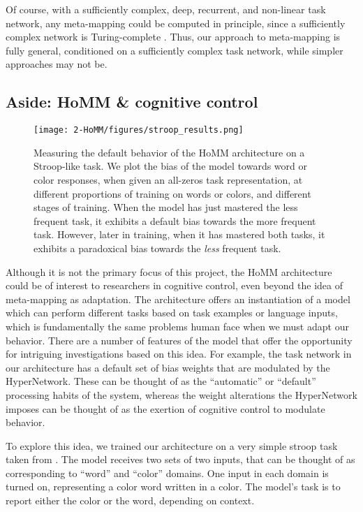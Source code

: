 Of course, with a sufficiently complex, deep, recurrent, and non-linear task network, any meta-mapping could be computed in principle, since a sufficiently complex network is Turing-complete \citep{Siegelman1992}. Thus, our approach to meta-mapping is fully general, conditioned on a sufficiently complex task network, while simpler approaches may not be.



\subsection{Aside: HoMM \& cognitive control}
\begin{figure}
\centering
\texttt{[image: 2-HoMM/figures/stroop\_results.png]}
\caption[Measuring the default behavior of the HoMM architecture on a Stroop-like task.]{Measuring the default behavior of the HoMM architecture on a Stroop-like task. We plot the bias of the model towards word or color responses, when given an all-zeros task representation, at different proportions of training on words or colors, and different stages of training. When the model has just mastered the less frequent task, it exhibits a default bias towards the more frequent task. However, later in training, when it has mastered both tasks, it exhibits a paradoxical bias towards the \emph{less} frequent task.} \label{supp_fig:HoMM_cognitive_control}
\end{figure}

Although it is not the primary focus of this project, the HoMM architecture could be of interest to researchers in cognitive control, even beyond the idea of meta-mapping as adaptation. The architecture offers an instantiation of a model which can perform different tasks based on task examples or language inputs, which is fundamentally the same problems human face when we must adapt our behavior. There are a number of features of the model that offer the opportunity for intriguing investigations based on this idea. For example, the task network in our architecture has a default set of bias weights that are modulated by the HyperNetwork. These can be thought of as the ``automatic'' or ``default'' processing habits of the system, whereas the weight alterations the HyperNetwork imposes can be thought of as the exertion of cognitive control to modulate behavior. 

To explore this idea, we trained our architecture on a very simple stroop task taken from \citet{Cohen1990}. The model receives two sets of two inputs, that can be thought of as corresponding to ``word'' and ``color'' domains. One input in each domain is turned on, representing a color word written in a color. The model's task is to report either the color or the word, depending on context.

